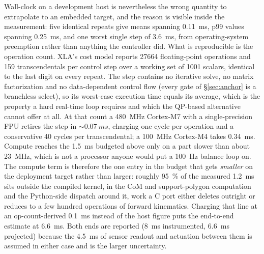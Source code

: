 \documentclass[conference]{IEEEtran}
\begin{document}
Wall-clock on a development host is nevertheless the wrong quantity to extrapolate to an embedded target, and the reason is visible inside the measurement: five identical repeats give means spanning \SI{0.11}{ms}, p99 values spanning \SI{0.25}{ms}, and one worst single step of \SI{3.6}{ms}, from operating-system preemption rather than anything the controller did. What is reproducible is the operation count. XLA's cost model reports \num{27664} floating-point operations and \num{159} transcendentals per control step over a working set of \num{1001} scalars, identical to the last digit on every repeat. The step contains no iterative solve, no matrix factorization and no data-dependent control flow (every gate of \S\ref{sec:anchor} is a branchless select), so its worst-case execution time equals its average, which is the property a hard real-time loop requires and which the QP-based alternative cannot offer at all. At that count a \SI{480}{MHz} Cortex-M7 with a single-precision FPU retires the step in ${\sim}\SI{0.07}{ms}$, charging one cycle per operation and a conservative \num{40} cycles per transcendental; a \SI{100}{MHz} Cortex-M4 takes \SI{0.34}{ms}. Compute reaches the \SI{1.5}{ms} budgeted above only on a part slower than about \SI{23}{MHz}, which is not a processor anyone would put a \SI{100}{Hz} balance loop on. The compute term is therefore the one entry in the budget that gets \emph{smaller} on the deployment target rather than larger: roughly \SI{95}{\percent} of the measured \SI{1.2}{ms} sits outside the compiled kernel, in the CoM and support-polygon computation and the Python-side dispatch around it, work a C port either deletes outright or reduces to a few hundred operations of forward kinematics. Charging that line at an op-count-derived \SI{0.1}{ms} instead of the host figure puts the end-to-end estimate at \SI{6.6}{ms}. Both ends are reported (\SI{8}{ms} instrumented, \SI{6.6}{ms} projected) because the \SI{4.5}{ms} of sensor readout and actuation between them is assumed in either case and is the larger uncertainty.
\end{document}

